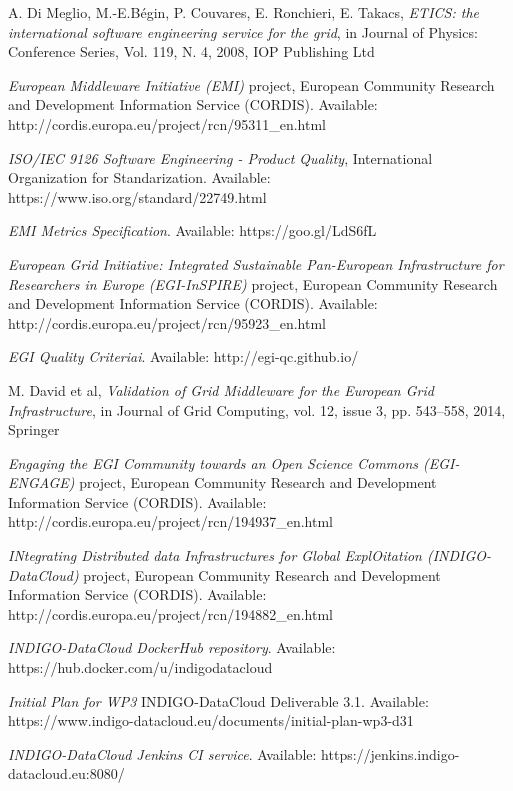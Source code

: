 \documentclass[journal]{IEEEtran}
\begin{document}
\begin{thebibliography}{1}
A. Di Meglio, M.-E.Bégin, P. Couvares, E. Ronchieri, E. Takacs, \emph{ETICS: the international software engineering service for the grid}, in Journal of Physics: Conference Series, Vol. 119, N. 4, 2008, IOP Publishing Ltd

\emph{European Middleware Initiative (EMI)} project, European Community Research and Development Information Service (CORDIS). Available: http://cordis.europa.eu/project/rcn/95311\_en.html

\emph{ISO/IEC 9126 Software Engineering - Product Quality}, International Organization for Standarization. Available: https://www.iso.org/standard/22749.html

\emph{EMI Metrics Specification}. Available: https://goo.gl/LdS6fL

\emph{European Grid Initiative: Integrated Sustainable Pan-European Infrastructure for Researchers in Europe (EGI-InSPIRE)} project, European Community Research and Development Information Service (CORDIS). Available: http://cordis.europa.eu/project/rcn/95923\_en.html

\emph{EGI Quality Criteriai}. Available: http://egi-qc.github.io/

M. David et al, \emph{Validation of Grid Middleware for the European Grid Infrastructure}, in Journal of Grid Computing, vol. 12, issue 3, pp. 543–558, 2014, Springer

\emph{Engaging the EGI Community towards an Open Science Commons (EGI-ENGAGE)} project, European Community Research and Development Information Service (CORDIS). Available: http://cordis.europa.eu/project/rcn/194937\_en.html

\emph{INtegrating Distributed data Infrastructures for Global ExplOitation (INDIGO-DataCloud)} project, European Community Research and Development Information Service (CORDIS). Available: http://cordis.europa.eu/project/rcn/194882\_en.html

\emph{INDIGO-DataCloud DockerHub repository}. Available: https://hub.docker.com/u/indigodatacloud

\emph{Initial Plan for WP3} INDIGO-DataCloud Deliverable 3.1. Available: https://www.indigo-datacloud.eu/documents/initial-plan-wp3-d31

\emph{INDIGO-DataCloud Jenkins CI service}. Available: https://jenkins.indigo-datacloud.eu:8080/


\end{thebibliography}
\end{document}
